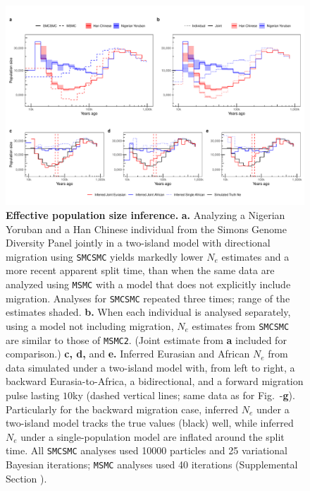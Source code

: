 \begin{figure}
	\centering
	\includegraphics[width=\textwidth]{plot/new_ne_figure.pdf}
	\caption[Effective Population Size Inference]{{\bf Effective population size inference.} {\bf a.} Analyzing a Nigerian Yoruban and a Han Chinese individual from the Simons Genome Diversity Panel jointly in a two-island model with directional migration using {\tt SMCSMC} yields markedly lower $N_e$ estimates and a more recent apparent split time, than when the same data are analyzed using {\tt MSMC} with a model that does not explicitly include migration. Analyses for {\tt SMCSMC} repeated three times; range of the estimates shaded. {\bf b.} When each individual is analysed separately, using a model not including migration, $N_e$ estimates from {\tt SMCSMC} are similar to those of {\tt MSMC2}. (Joint estimate from {\bf a} included for comparison.) {\bf c, d,} and {\bf e.} 
	Inferred Eurasian and African $N_e$ from data simulated under a two-island model with, from left to right, a backward Eurasia-to-Africa, a bidirectional, and a forward  migration pulse lasting $10$ky (dashed vertical lines; same data as for Fig.\ -{\bf g}).  Particularly for the backward migration case, inferred $N_e$ under a two-island model tracks the true values (black) well, while inferred $N_e$ under a single-population model are inflated around the split time.
 All {\tt SMCSMC} analyses used 10000 particles and 25 variational Bayesian iterations; {\tt MSMC} analyses used 40 iterations (Supplemental Section ).}

\end{figure}
